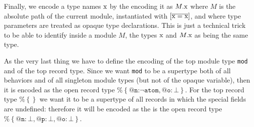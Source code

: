 \documentclass[a4paper,10pt]{article}
\begin{document}
Finally, we encode a type names $\text{\rm x}$ by the encoding it as $M.\text{\rm x}$ where $M$ is the absolute path of the current module, instantiated with $[\overline{\text{\rm x}=\text{\rm x}}]$, and where type parameters are treated as opaque type declarations. This is just a technical trick to be able to identify inside a module $M$, the types $\text{\rm x}$ and $M.\text{\rm x}$ as being the same type.

As the very last thing we have to define the encoding of the top module type \texttt{mod} and of the top record type. Since we want \texttt{mod} to be a supertype both of all behaviors and of all singleton module types (but not of the opaque variable), then it is encoded as the open record type $\texttt{\%}\!\left\{\texttt{@n:} \neg\texttt{atom},\texttt{@o}:\bot\right\}$. For the top record type $\texttt{\%}\!\left\{\right\}$ we want it to be a supertype of all records in which the special fields are undefined: therefore it will be encoded as the is the open record type $\texttt{\%}\!\left\{\texttt{@n}:\bot,\texttt{@p}:\bot, \texttt{@o}:\bot\right\}$.
 
\end{document}
